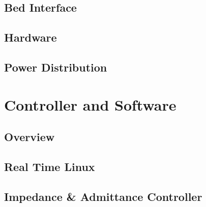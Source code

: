 \documentclass[12pt]{report}
\begin{document}
	\section{Bed Interface}
%
	\section{Hardware}
%
	\section{Power Distribution}

\chapter{Controller and Software}

	\section{Overview}
		
	\section{Real Time Linux}
	
%

		
	
	\section{Impedance \& Admittance Controller}

%
\end{document}
